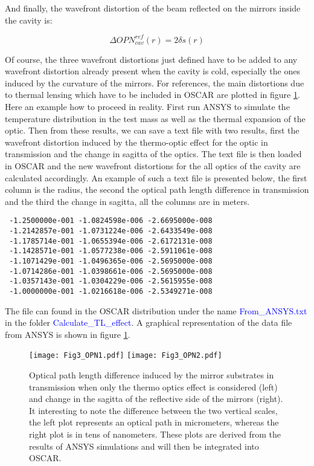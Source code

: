 And finally, the wavefront distortion of the beam reflected on the mirrors inside the cavity is:

\begin{equation}\label{eq3:OPN3}
  \Delta OPN_{cav}^{ref}(r) = 2 \delta s(r)
\end{equation}

Of course, the three wavefront distortions just defined have to be added to any wavefront distortion already present when the cavity is cold, especially the ones induced by the curvature of the mirrors. For references, the main distortions due to thermal lensing which have to be included in OSCAR are plotted in figure \ref{fig3:OPN}.\\

Here an example how to proceed in reality. First run ANSYS to simulate the temperature distribution in the test mass as well as the thermal expansion of the optic. Then from these results, we can save a text file with two results, first the wavefront distortion induced by the thermo-optic effect for the optic in transmission and the change in sagitta of the optics. The text file is then loaded in OSCAR and the new wavefront distortions for the all optics of the cavity are calculated accordingly. An example of such a text file is presented below, the first column is the radius, the second the optical path length difference in transmission and the third the change in sagitta, all the columns are in meters.

\begin{verbatim}
 -1.2500000e-001 -1.0824598e-006 -2.6695000e-008
 -1.2142857e-001 -1.0731224e-006 -2.6433549e-008
 -1.1785714e-001 -1.0655394e-006 -2.6172131e-008
 -1.1428571e-001 -1.0577238e-006 -2.5911061e-008
 -1.1071429e-001 -1.0496365e-006 -2.5695000e-008
 -1.0714286e-001 -1.0398661e-006 -2.5695000e-008
 -1.0357143e-001 -1.0304229e-006 -2.5615955e-008
 -1.0000000e-001 -1.0216618e-006 -2.5349271e-008
\end{verbatim}

The file can found in the OSCAR distribution under the name \textcolor{blue}{From\_ANSYS.txt} in the folder \textcolor{blue}{Calculate\_TL\_effect}. A graphical representation of the data file from ANSYS is shown in figure \ref{fig3:OPN}.


\begin{figure}
\begin{center}
\texttt{[image: Fig3\_OPN1.pdf]}\hfill
\texttt{[image: Fig3\_OPN2.pdf]}
\end{center}
\caption{\label{fig3:OPN} Optical path length difference induced by the mirror substrates in transmission when only the thermo optics effect is considered (left) and change in the sagitta of the reflective side of the mirrors (right). It interesting to note the difference between the two vertical scales, the left plot represents an optical path in micrometers, whereas the right plot is in tens of nanometers. These plots are derived from the results of ANSYS simulations and will then be integrated into OSCAR.}
\end{figure}

